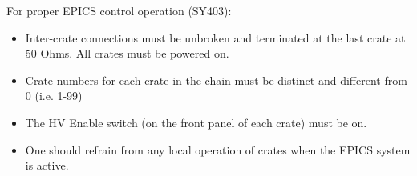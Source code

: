 {For proper EPICS control operation (SY403):

\begin{itemize}
\item{Inter-crate connections must be unbroken and terminated at the
last crate at 50 Ohms.  All crates must be powered on.}
\item{Crate numbers for each crate in the chain must be distinct and
different from 0 (i.e. 1-99)}
\item{The HV Enable switch (on the front panel of each crate) must be on.}
\item{One should refrain from any local operation of crates when the
EPICS system is active.}
\end{itemize}
}


